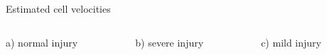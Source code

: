 \documentclass[mathserif,11pt]{beamer}
\begin{document}
\begin{frame}{Estimated cell velocities}
\begin{columns}
	\begin{column}{0.32\textwidth}
		\scalebox{0.7}{}\vfil
		\scalebox{0.7}{}
	\end{column}
	\begin{column}{0.3\textwidth}
		\scalebox{0.7}{}\vfil
		\scalebox{0.7}{}
	\end{column}
	\begin{column}{0.3\textwidth}
		\scalebox{0.7}{}\vfil
		\scalebox{0.7}{}
	\end{column}
\end{columns}
\begin{columns}
	\centering
	\begin{column}{0.32\textwidth}
		\centering
		\footnotesize{ a) normal injury}
	\end{column}
	\begin{column}{0.3\textwidth}
		\centering
		\footnotesize{ b) severe injury}
	\end{column}
	\begin{column}{0.3\textwidth}
		\centering
		\footnotesize{ c) mild injury}
	\end{column}
\end{columns}
\end{frame}
%		
\end{document}
